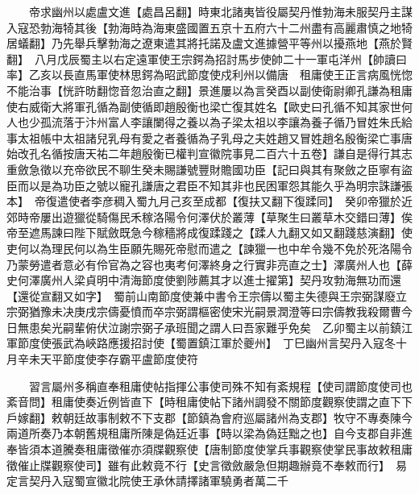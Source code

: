 　　帝求幽州以處盧文進【處昌呂翻】時東北諸夷皆役屬契丹惟勃海未服契丹主謀入寇恐勃海犄其後【勃海時為海東盛國置五京十五府六十二州盡有高麗肅慎之地犄居蟻翻】乃先舉兵擊勃海之遼東遣其將托諾及盧文進據營平等州以擾燕地【燕於賢翻】　八月戊辰蜀主以右定遠軍使王宗鍔為招討馬步使帥二十一軍屯洋州【帥讀曰率】乙亥以長直馬軍使林思鍔為昭武節度使戍利州以備唐　租庸使王正言病風恍惚不能治事【恍許昉翻惚音忽治直之翻】景進屢以為言癸酉以副使衛尉卿孔謙為租庸使右威衛大將軍孔循為副使循即趙殷衡也梁亡復其姓名【歐史曰孔循不知其家世何人也少孤流落于汴州富人李讓闌得之養以為子梁太祖以李讓為養子循乃冒姓朱氏給事太祖帳中太祖諸兒乳母有愛之者養循為子乳母之夫姓趙又冒姓趙名殷衡梁亡事唐始改孔名循按唐天祐二年趙殷衡已權判宣徽院事見二百六十五卷】謙自是得行其志重斂急徵以充帝欲民不聊生癸未賜謙號豐財贍國功臣【記曰與其有聚斂之臣寧有盜臣而以是為功臣之號以寵孔謙唐之君臣不知其非也民困軍怨其能久乎為明宗誅謙張本】　帝復遣使者李彦稠入蜀九月己亥至成都【復扶又翻下復蹂同】　癸卯帝獵於近郊時帝屢出遊獵從騎傷民禾稼洛陽令何澤伏於叢薄【草聚生曰叢草木交錯曰薄】俟帝至遮馬諫曰陛下賦斂既急今稼穡將成復蹂踐之【蹂人九翻又如又翻踐慈演翻】使吏何以為理民何以為生臣願先賜死帝慰而遣之【諫獵一也中牟令幾不免於死洛陽令乃蒙勞遣者意必有伶官為之容也夷考何澤終身之行實非亮直之士】澤廣州人也【薛史何澤廣州人梁貞明中清海節度使劉陟薦其才以進士擢第】契丹攻勃海無功而還【還從宣翻又如字】　蜀前山南節度使兼中書令王宗儔以蜀主失德與王宗弼謀廢立宗弼猶豫未决庚戌宗儔憂憤而卒宗弼謂樞密使宋光嗣景潤澄等曰宗儔教我殺爾曹今日無患矣光嗣輩俯伏泣謝宗弼子承班聞之謂人曰吾家難乎免矣　乙卯蜀主以前鎮江軍節度使張武為峽路應援招討使【蜀置鎮江軍於夔州】　丁巳幽州言契丹入寇冬十月辛未天平節度使李存霸平盧節度使符

　　習言屬州多稱直奉租庸使帖指揮公事使司殊不知有紊規程【使司謂節度使司也紊音問】租庸使奏近例皆直下【時租庸使帖下諸州調發不關節度觀察使謂之直下下戶嫁翻】敕朝廷故事制敕不下支郡【節鎮為會府巡屬諸州為支郡】牧守不專奏陳今兩道所奏乃本朝舊規租庸所陳是偽廷近事【時以梁為偽廷黜之也】自今支郡自非進奉皆須本道騰奏租庸徵催亦須牒觀察使【唐制節度使掌兵事觀察使掌民事故敕租庸徵催止牒觀察使司】雖有此敕竟不行【史言徵斂嚴急但期趣辦竟不奉敕而行】　易定言契丹入寇蜀宣徽北院使王承休請擇諸軍驍勇者萬二千

